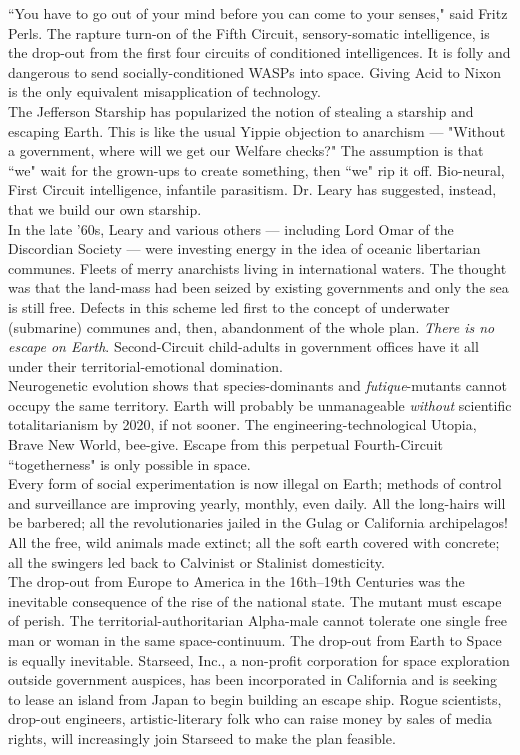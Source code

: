 ``You have to go out of your mind before you can come to your senses," said Fritz Perls. The rapture turn-on of the Fifth Circuit, sensory-somatic intelligence, is the drop-out from the first four circuits of conditioned intelligences. It is folly and dangerous to send socially-conditioned WASPs into space. Giving Acid to Nixon is the only equivalent misapplication of technology.\\
The Jefferson Starship has popularized the notion of stealing a starship and escaping Earth. This is like the usual Yippie objection to anarchism --- "Without a government, where will we get our Welfare checks?" The assumption is that ``we" wait for the grown-ups to create something, then ``we" rip it off. Bio-neural, First Circuit intelligence, infantile parasitism. Dr. Leary has suggested, instead, that we build our own starship.\\
In the late '60s, Leary and various others --- including Lord Omar of the Discordian Society --- were investing energy in the idea of oceanic libertarian communes. Fleets of merry anarchists living in international waters. The thought was that the land-mass had been seized by existing governments and only the sea is still free. Defects in this scheme led first to the concept of underwater (submarine) communes and, then, abandonment of the whole plan. \emph{There is no escape on Earth}. Second-Circuit child-adults in government offices have it all under their territorial-emotional domination.\\
Neurogenetic evolution shows that species-dominants and \emph{futique}-mutants cannot occupy the same territory. Earth will probably be unmanageable \emph{without} scientific totalitarianism by 2020, if not sooner. The engineering-technological Utopia, Brave New World, bee-give. Escape from this perpetual Fourth-Circuit ``togetherness" is only possible in space.\\
Every form of social experimentation is now illegal on Earth; methods of control and surveillance are improving yearly, monthly, even daily. All the long-hairs will be barbered; all the revolutionaries jailed in the Gulag or California archipelagos! All the free, wild animals made extinct; all the soft earth covered with concrete; all the swingers led back to Calvinist or Stalinist domesticity.\\
The drop-out from Europe to America in the 16th--19th Centuries was the inevitable consequence of the rise of the national state. The mutant must escape of perish. The territorial-authoritarian Alpha-male cannot tolerate one single free man or woman in the same space-continuum. The drop-out from Earth to Space is equally inevitable. Starseed, Inc., a non-profit corporation for space exploration outside government auspices, has been incorporated in California and is seeking to lease an island from Japan to begin building an escape ship. Rogue scientists, drop-out engineers, artistic-literary folk who can raise money by sales of media rights, will increasingly join Starseed to make the plan feasible.\\
